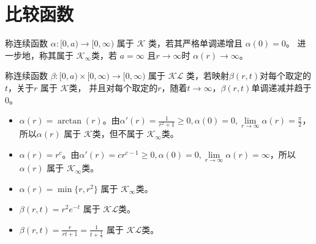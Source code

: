 \section{比较函数}\label{3Aref}

\begin{definition}
  称连续函数 $\alpha : [0, a) \rightarrow [0, \infty)$ 属于 $\mathcal{K}$ 类，若其严格单调递增且 $\alpha (0) =0$。
  进一步地，称其属于 $\mathcal{K}_{\infty}$类，若 $a = \infty$ 且$r \rightarrow \infty$时
  $\alpha (r) \rightarrow \infty$。
\end{definition}

\begin{definition}
  称连续函数 $\beta : [0, a) \times [0, \infty) \rightarrow [0,
  \infty)$ 属于 $\mathcal{K}\mathcal{L}$ 类，若映射$\beta (r, t)$对每个取定的$t$，关于$r$ 属于 $\mathcal{K}$类，
  并且对每个取定的$r$，随着$t
  \rightarrow \infty$，$\beta (r, t)$单调递减并趋于$ 0$。
\end{definition}

\begin{example}  
  \begin{itemize}[leftmargin=1em]
    \item $\alpha (r) = \arctan (r)$。由$\alpha' (r) = \frac{1}{r^2 + 1} \geq 0,
    \alpha (0) = 0, \lim\limits_{r \rightarrow \infty} \alpha (r) = \frac{\pi}{2}$，
    所以$\alpha (r)$ 属于 $\mathcal{K}$类，但不属于 $\mathcal{K}_{\infty}$类。
    
    \item $\alpha (r) = r^c$。由$ \alpha' (r) = c r^{c-1} \geq 0, \alpha (0) = 0, \lim\limits_{r
    \rightarrow \infty} \alpha (r) = \infty$，所以 $\alpha (r)$ 属于 $\mathcal{K}_{\infty}$类。
    
    \item $\alpha (r) = \min \{ r, r^2 \}$ 属于 $\mathcal{K}_{\infty}$类。
    
    \item $\beta (r, t) = r^2 e^{- t}$ 属于    $\mathcal{K}\mathcal{L}$类。
    \item $\beta (r, t) = \frac{r}{rt+1}=\frac{1}{t+\frac1\gamma}$ 属于 $\mathcal{K}\mathcal{L}$类。
  \end{itemize}
\end{example}


